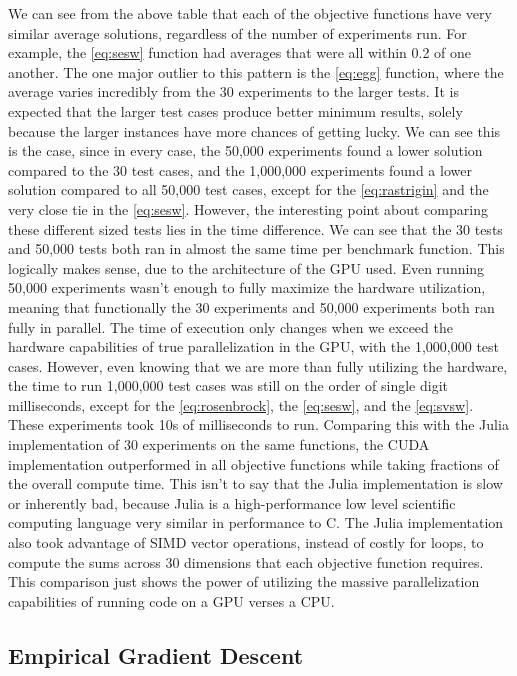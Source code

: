 \documentclass{article}
\begin{document}
$ $ \\ $ $ \\ 
We can see from the above table that each of the objective functions have very similar average solutions, regardless of the number of experiments run. For example, the \ref{eq:sesw} function had averages that were all within 0.2 of one another. The one major outlier to this pattern is the \ref{eq:egg} function, where the average varies incredibly from the 30 experiments to the larger tests. It is expected that the larger test cases produce better minimum results, solely because the larger instances have more chances of getting lucky. We can see this is the case, since in every case, the 50,000 experiments found a lower solution compared to the 30 test cases, and the 1,000,000 experiments found a lower solution compared to all 50,000 test cases, except for the \ref{eq:rastrigin} and the very close tie in the \ref{eq:sesw}. However, the interesting point about comparing these different sized tests lies in the time difference. We can see that the 30 tests and 50,000 tests both ran in almost the same time per benchmark function. This logically makes sense, due to the architecture of the GPU used. Even running 50,000 experiments wasn't enough to fully maximize the hardware utilization, meaning that functionally the 30 experiments and 50,000 experiments both ran fully in parallel. The time of execution only changes when we exceed the hardware capabilities of true parallelization in the GPU, with the 1,000,000 test cases. However, even knowing that we are more than fully utilizing the hardware, the time to run 1,000,000 test cases was still on the order of single digit milliseconds, except for the \ref{eq:rosenbrock}, the \ref{eq:sesw}, and the \ref{eq:svsw}. These experiments took 10s of milliseconds to run. Comparing this with the Julia implementation of 30 experiments on the same functions, the CUDA implementation outperformed in all objective functions while taking fractions of the overall compute time. This isn't to say that the Julia implementation is slow or inherently bad, because Julia is a high-performance low level scientific computing language very similar in performance to C. The Julia implementation also took advantage of SIMD vector operations, instead of costly for loops, to compute the sums across 30 dimensions that each objective function requires. This comparison just shows the power of utilizing the massive parallelization capabilities of running code on a GPU verses a CPU. 

        \subsection{Empirical Gradient Descent}
\end{document}
